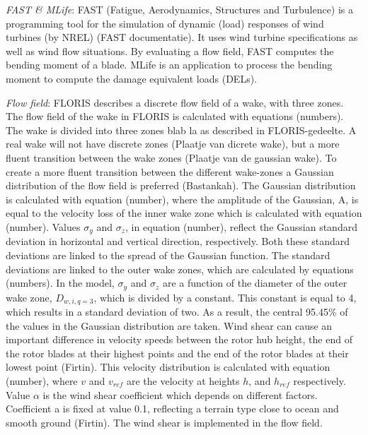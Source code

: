 \documentclass[twoside,twocolumn]{article}
\begin{document}
\textit{FAST \& MLife}: FAST (Fatigue, Aerodynamics, Structures and Turbulence) is a programming tool for the simulation of dynamic (load) responses of wind turbines (by NREL) (FAST documentatie). It uses wind turbine specifications as well as wind flow situations. By evaluating a flow field, FAST computes the bending moment of a blade. MLife is an application to process the bending moment to compute the damage equivalent loads (DELs). 



\textit{Flow field}: FLORIS describes a discrete flow field of a wake, with three zones. The flow field of the wake in FLORIS is calculated with equations (numbers). The wake is divided into three zones blab la as described in FLORIS-gedeelte. A real wake will not have discrete zones (Plaatje van dicrete wake), but a more fluent transition between the wake zones (Plaatje van de gaussian wake). To create a more fluent transition between the different wake-zones a Gaussian distribution of the flow field is preferred (Bastankah). The Gaussian distribution is calculated with equation (number), where the amplitude of the Gaussian, A, is equal to the velocity loss of the inner wake zone which is calculated with equation (number). Values $\sigma_y$ and $\sigma_z$, in equation (number), reflect the Gaussian standard deviation in horizontal and vertical direction, respectively. Both these standard deviations are linked to the spread of the Gaussian function. The standard deviations are linked to the outer wake zones, which are calculated by equations (numbers). In the model, $\sigma_y$ and $\sigma_z$ are a function of the diameter of the outer wake zone,  $D_{w,i,q=3}$, which is divided by a constant. This constant is equal to 4, which results in a standard deviation of two. As a result, the central 95.45\% of the values in the Gaussian distribution are taken. 
Wind shear can cause an important difference in velocity speeds between the rotor hub height, the end of the rotor blades at their highest points and the end of the rotor blades at their lowest point (Firtin). This velocity distribution is calculated with equation (number), where $v$ and $v_{ref}$ are the velocity at heights $h$, and $h_{ref}$  respectively. Value $\alpha$ is the wind shear coefficient which depends on different factors. Coefficient a is fixed at value 0.1, reflecting a terrain type close to ocean and smooth ground (Firtin). The wind shear is implemented in the flow field.
\end{document}
